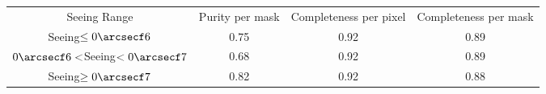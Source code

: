 
\begin{table}
\begin{tabular}{cccc}
Seeing Range & Purity per mask & Completeness per pixel & Completeness per mask \\
Seeing$\leq 0\arcsecf6$ & 0.75 & 0.92 & 0.89 \\
$0\arcsecf6<$Seeing$<0\arcsecf7$ & 0.68 & 0.92 & 0.89 \\
Seeing$\geq0\arcsecf7$ & 0.82 & 0.92 & 0.88 \\
\end{tabular}
\end{table}
%
%
%
%
%
%
